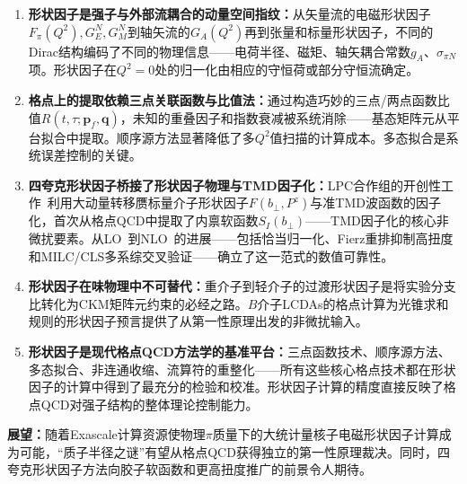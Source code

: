 \documentclass[12pt,a4paper]{ctexart}
\theoremstyle{definition}
\begin{document}
\begin{enumerate}[leftmargin=*]
    \item \textbf{形状因子是强子与外部流耦合的动量空间指纹：}从矢量流的电磁形状因子$F_\pi(Q^2), G_E^N, G_M^N$到轴矢流的$G_A(Q^2)$再到张量和标量形状因子，不同的Dirac结构编码了不同的物理信息——电荷半径、磁矩、轴矢耦合常数$g_A$、$\sigma_{\pi N}$项。形状因子在$Q^2=0$处的归一化由相应的守恒荷或部分守恒流确定。

    \item \textbf{格点上的提取依赖三点关联函数与比值法：}通过构造巧妙的三点/两点函数比值$R(t,\tau;\mathbf{p}_f,\mathbf{q})$，未知的重叠因子和指数衰减被系统消除——基态矩阵元从平台拟合中提取。顺序源方法显著降低了多$Q^2$值扫描的计算成本。多态拟合是系统误差控制的关键。

    \item \textbf{四夸克形状因子桥接了形状因子物理与TMD因子化：}LPC合作组的开创性工作~\cite{LPC2020soft}利用大动量转移赝标量介子形状因子$F(b_\perp, P^z)$与准TMD波函数的因子化，首次从格点QCD中提取了内禀软函数$S_I(b_\perp)$——TMD因子化的核心非微扰要素。从LO~\cite{LPC2020soft}到NLO~\cite{Chu2023soft}的进展——包括恰当归一化、Fierz重排抑制高扭度和MILC/CLS多系综交叉验证——确立了这一范式的数值可靠性。

    \item \textbf{形状因子在味物理中不可替代：}重介子到轻介子的过渡形状因子是将实验分支比转化为CKM矩阵元约束的必经之路。$B$介子LCDAs的格点计算为光锥求和规则的形状因子预言提供了从第一性原理出发的非微扰输入。

    \item \textbf{形状因子是现代格点QCD方法学的基准平台：}三点函数技术、顺序源方法、多态拟合、非连通收缩、流算符的重整化——所有这些核心格点技术都在形状因子的计算中得到了最充分的检验和校准。形状因子计算的精度直接反映了格点QCD对强子结构的整体理论控制能力。

\end{enumerate}

\textbf{展望：}随着Exascale计算资源使物理$\pi$质量下的大统计量核子电磁形状因子计算成为可能，``质子半径之谜''有望从格点QCD获得独立的第一性原理裁决。同时，四夸克形状因子方法向胶子软函数和更高扭度推广的前景令人期待。
\end{document}
